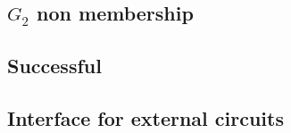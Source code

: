 \subsection{$G_2$ non membership}                    \label{ec data: circuits: G2 non membership}              
\subsection{Successful \instEcpairing{}}             \label{ec data: circuits: successful pairing}             
\subsection{Interface for external circuits}                     \label{ec data: interface for exernal circuits}                      
